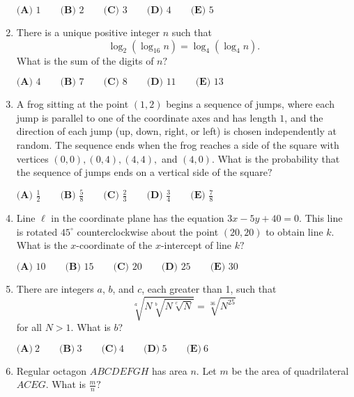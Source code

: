 \documentclass{article}
\begin{document}
\begin{enumerate}[label=\arabic*., itemsep=0.5em]
\(\textbf{(A) } 1 \qquad \textbf{(B) } 2 \qquad \textbf{(C) } 3 \qquad \textbf{(D) } 4 \qquad \textbf{(E) } 5\)\par \vspace{0.5em}\item There is a unique positive integer \(n\) such that
\begin{equation*}
\log_2{(\log_{16}{n})} = \log_4{(\log_4{n})}.
\end{equation*}
What is the sum of the digits of \(n?\)

\(\textbf{(A) } 4 \qquad \textbf{(B) } 7 \qquad \textbf{(C) } 8 \qquad \textbf{(D) } 11 \qquad \textbf{(E) } 13\)\par \vspace{0.5em}\item A frog sitting at the point \((1, 2)\) begins a sequence of jumps, where each jump is parallel to one of the coordinate axes and has length \(1\), and the direction of each jump (up, down, right, or left) is chosen independently at random. The sequence ends when the frog reaches a side of the square with vertices \((0,0), (0,4), (4,4),\) and \((4,0)\). What is the probability that the sequence of jumps ends on a vertical side of the square\(?\)

\(\textbf{(A) } \frac{1}{2} \qquad \textbf{(B) } \frac{5}{8} \qquad \textbf{(C) } \frac{2}{3} \qquad \textbf{(D) } \frac{3}{4} \qquad \textbf{(E) } \frac{7}{8}\)\par \vspace{0.5em}\item Line \(\ell\) in the coordinate plane has the equation \(3x - 5y + 40 = 0\). This line is rotated \(45^{\circ}\) counterclockwise about the point \((20, 20)\) to obtain line \(k\). What is the \(x\)-coordinate of the \(x\)-intercept of line \(k?\)

\(\textbf{(A) } 10 \qquad \textbf{(B) } 15 \qquad \textbf{(C) } 20 \qquad \textbf{(D) } 25 \qquad \textbf{(E) } 30\)\par \vspace{0.5em}\item There are integers \(a\), \(b\), and \(c\), each greater than 1, such that
\begin{equation*}
\sqrt[a]{N \sqrt[b]{N \sqrt[c]{N}}} = \sqrt[36]{N^{25}}
\end{equation*}
for all \(N > 1\). What is \(b\)?

\(\textbf{(A)}\ 2\qquad\textbf{(B)}\ 3\qquad\textbf{(C)}\ 4\qquad\textbf{(D)}\ 5\qquad\textbf{(E)}\ 6\)\par \vspace{0.5em}\item Regular octagon \(ABCDEFGH\) has area \(n\). Let \(m\) be the area of quadrilateral \(ACEG\). What is \(\tfrac{m}{n}?\)


\end{enumerate}
\end{document}

